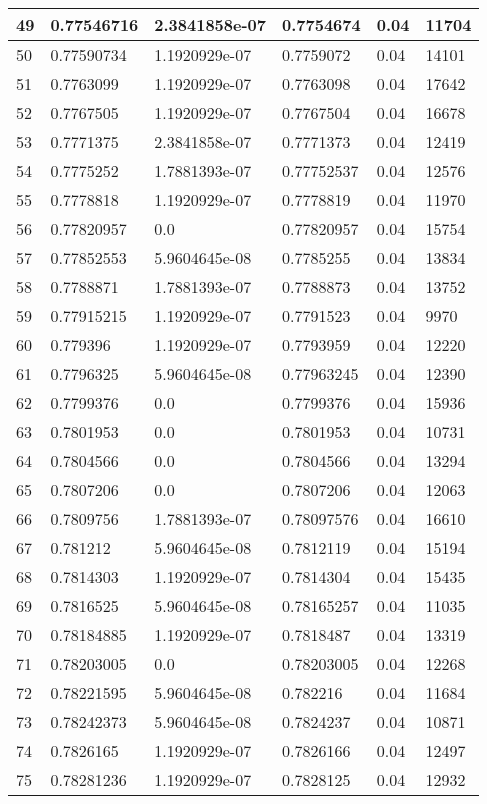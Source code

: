 \begin{longtable}{|l|l|l|l|l|l|}
49 & 0.77546716 & 2.3841858e-07 & 0.7754674 & 0.04 & 11704 \\ \hline 
50 & 0.77590734 & 1.1920929e-07 & 0.7759072 & 0.04 & 14101 \\ \hline 
51 & 0.7763099 & 1.1920929e-07 & 0.7763098 & 0.04 & 17642 \\ \hline 
52 & 0.7767505 & 1.1920929e-07 & 0.7767504 & 0.04 & 16678 \\ \hline 
53 & 0.7771375 & 2.3841858e-07 & 0.7771373 & 0.04 & 12419 \\ \hline 
54 & 0.7775252 & 1.7881393e-07 & 0.77752537 & 0.04 & 12576 \\ \hline 
55 & 0.7778818 & 1.1920929e-07 & 0.7778819 & 0.04 & 11970 \\ \hline 
56 & 0.77820957 & 0.0 & 0.77820957 & 0.04 & 15754 \\ \hline 
57 & 0.77852553 & 5.9604645e-08 & 0.7785255 & 0.04 & 13834 \\ \hline 
58 & 0.7788871 & 1.7881393e-07 & 0.7788873 & 0.04 & 13752 \\ \hline 
59 & 0.77915215 & 1.1920929e-07 & 0.7791523 & 0.04 & 9970 \\ \hline 
60 & 0.779396 & 1.1920929e-07 & 0.7793959 & 0.04 & 12220 \\ \hline 
61 & 0.7796325 & 5.9604645e-08 & 0.77963245 & 0.04 & 12390 \\ \hline 
62 & 0.7799376 & 0.0 & 0.7799376 & 0.04 & 15936 \\ \hline 
63 & 0.7801953 & 0.0 & 0.7801953 & 0.04 & 10731 \\ \hline 
64 & 0.7804566 & 0.0 & 0.7804566 & 0.04 & 13294 \\ \hline 
65 & 0.7807206 & 0.0 & 0.7807206 & 0.04 & 12063 \\ \hline 
66 & 0.7809756 & 1.7881393e-07 & 0.78097576 & 0.04 & 16610 \\ \hline 
67 & 0.781212 & 5.9604645e-08 & 0.7812119 & 0.04 & 15194 \\ \hline 
68 & 0.7814303 & 1.1920929e-07 & 0.7814304 & 0.04 & 15435 \\ \hline 
69 & 0.7816525 & 5.9604645e-08 & 0.78165257 & 0.04 & 11035 \\ \hline 
70 & 0.78184885 & 1.1920929e-07 & 0.7818487 & 0.04 & 13319 \\ \hline 
71 & 0.78203005 & 0.0 & 0.78203005 & 0.04 & 12268 \\ \hline 
72 & 0.78221595 & 5.9604645e-08 & 0.782216 & 0.04 & 11684 \\ \hline 
73 & 0.78242373 & 5.9604645e-08 & 0.7824237 & 0.04 & 10871 \\ \hline 
74 & 0.7826165 & 1.1920929e-07 & 0.7826166 & 0.04 & 12497 \\ \hline 
75 & 0.78281236 & 1.1920929e-07 & 0.7828125 & 0.04 & 12932 \\ \hline 
\end{longtable}
